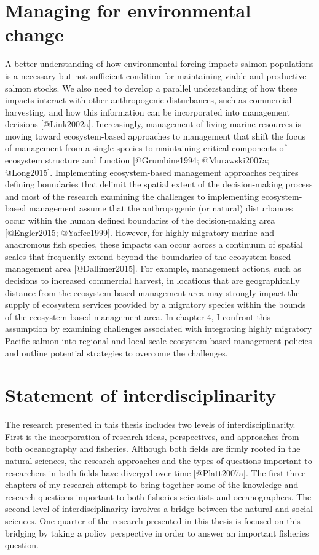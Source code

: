 \section{Managing for environmental
change}\label{managing-for-environmental-change}

A better understanding of how environmental forcing impacts salmon
populations is a necessary but not sufficient condition for maintaining
viable and productive salmon stocks. We also need to develop a parallel
understanding of how these impacts interact with other anthropogenic
disturbances, such as commercial harvesting, and how this information
can be incorporated into management decisions {[}@Link2002a{]}.
Increasingly, management of living marine resources is moving toward
ecosystem-based approaches to management that shift the focus of
management from a single-species to maintaining critical components of
ecosystem structure and function {[}@Grumbine1994; @Murawski2007a;
@Long2015{]}. Implementing ecosystem-based management approaches
requires defining boundaries that delimit the spatial extent of the
decision-making process and most of the research examining the
challenges to implementing ecosystem-based management assume that the
anthropogenic (or natural) disturbances occur within the human defined
boundaries of the decision-making area {[}@Engler2015; @Yaffee1999{]}.
However, for highly migratory marine and anadromous fish species, these
impacts can occur across a continuum of spatial scales that frequently
extend beyond the boundaries of the ecosystem-based management area
{[}@Dallimer2015{]}. For example, management actions, such as decisions
to increased commercial harvest, in locations that are geographically
distance from the ecosystem-based management area may strongly impact
the supply of ecosystem services provided by a migratory species within
the bounds of the ecosystem-based management area. In chapter 4, I
confront this assumption by examining challenges associated with
integrating highly migratory Pacific salmon into regional and local
scale ecosystem-based management policies and outline potential
strategies to overcome the challenges.

\section{Statement of
interdisciplinarity}\label{statement-of-interdisciplinarity}

The research presented in this thesis includes two levels of
interdisciplinarity. First is the incorporation of research ideas,
perspectives, and approaches from both oceanography and fisheries.
Although both fields are firmly rooted in the natural sciences, the
research approaches and the types of questions important to researchers
in both fields have diverged over time {[}@Platt2007a{]}. The first
three chapters of my research attempt to bring together some of the
knowledge and research questions important to both fisheries scientists
and oceanographers. The second level of interdisciplinarity involves a
bridge between the natural and social sciences. One-quarter of the
research presented in this thesis is focused on this bridging by taking
a policy perspective in order to answer an important fisheries question.

